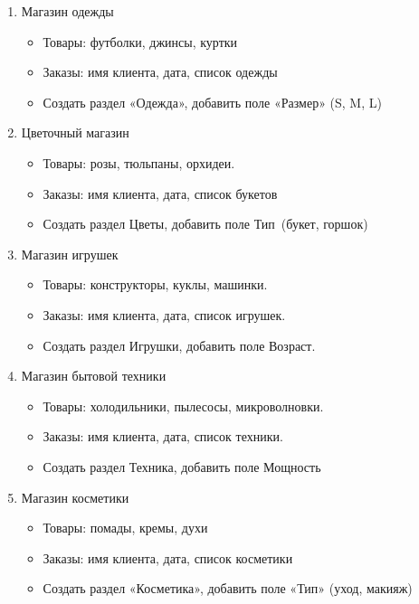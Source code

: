 \documentclass[12pt]{article}
\numberwithin{listing}{section}
\numberwithin{figure}{section}
\begin{document}
\begin{enumerate}
	\item Магазин одежды
	      \begin{itemize}
		      \item Товары: футболки, джинсы, куртки
		      \item Заказы: имя клиента, дата, список одежды
		      \item Создать раздел «Одежда», добавить поле «Размер» (S, M, L)
	      \end{itemize}

	\item Цветочный магазин
	      \begin{itemize}
		      \item Товары: розы, тюльпаны, орхидеи.
		      \item Заказы: имя клиента, дата, список букетов
		      \item Создать раздел \guillemotleft Цветы\guillemotright , добавить поле \guillemotleft Тип\guillemotright \ (букет, горшок)
	      \end{itemize}

	      \newpage

	\item Магазин игрушек
	      \begin{itemize}
		      \item Товары: конструкторы, куклы, машинки.
		      \item Заказы: имя клиента, дата, список игрушек.
		      \item Создать раздел \guillemotleft Игрушки\guillemotright, добавить поле \guillemotleft Возраст\guillemotright.
	      \end{itemize}

	\item Магазин бытовой техники
	      \begin{itemize}
		      \item Товары: холодильники, пылесосы, микроволновки.
		      \item Заказы: имя клиента, дата, список техники.
		      \item Создать раздел \guillemotleft Техника\guillemotright, добавить поле \guillemotleft Мощность\guillemotright
	      \end{itemize}

	\item Магазин косметики
	      \begin{itemize}
		      \item Товары: помады, кремы, духи
		      \item Заказы: имя клиента, дата, список косметики
		      \item Создать раздел «Косметика», добавить поле «Тип» (уход, макияж)
	      \end{itemize}


\end{enumerate}
\end{document}
